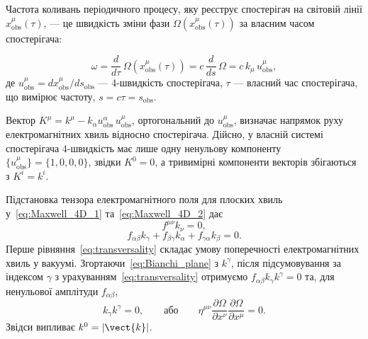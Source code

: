 Частота коливань періодичного процесу, яку реєструє спостерігач на світовій лінії $x_\text{obs}^{\mu}(\tau)$, --- це
швидкість зміни фази $\Omega\!\left(x_{\text{obs}}^{\mu}(\tau)\right)$ за власним часом спостерігача:

\begin{equation}\label{eq:freq_observer}
    \omega = \frac{d}{d\tau}\,\Omega\!\left(x_{\text{obs}}^{\mu}(\tau)\right)
    = c\,\frac{d}{ds}\,\Omega = c\,k_{\mu}\,u_{\text{obs}}^{\mu},
\end{equation}
де $u_{\text{obs}}^{\mu}=dx_{\text{obs}}^{\mu}/ds_{\text{obs}}$ --- 4-швидкість спостерігача, $\tau$ --- власний час
спостерігача, що вимірює частоту, $s=c\tau=s_{\text{obs}}$.

Вектор $K^{\mu}=k^{\mu}-k_{\alpha}u_{\text{obs}}^{\alpha}\,u_{\text{obs}}^{\mu}$, ортогональний до
$u_{\text{obs}}^{\mu}$, визначає напрямок руху електромагнітних хвиль відносно спостерігача. Дійсно, у власній системі
спостерігача 4-швидкість має лише одну ненульову компоненту $\{u_{\text{obs}}^{\mu}\}=\{1,0,0,0\}$, звідки $K^0=0$, а
тривимірні компоненти векторів збігаються з $K^i=k^i$.

Підстановка тензора електромагнітного поля для плоских хвиль у~\eqref{eq:Maxwell_4D_1} та~\eqref{eq:Maxwell_4D_2} дає
\begin{equation}\label{eq:transversality}
    f^{\mu\nu}k_{\nu} = 0,
\end{equation}
\begin{equation}\label{eq:Bianchi_plane}
    f_{\alpha\beta}k_{\gamma} + f_{\beta\gamma}k_{\alpha} + f_{\gamma\alpha}k_{\beta} = 0.
\end{equation}
Перше рівняння~\eqref{eq:transversality} складає умову поперечності електромагнітних хвиль у вакуумі.
Згортаючи~\eqref{eq:Bianchi_plane} з $k^{\gamma}$, після підсумовування за індексом $\gamma$ з
урахуванням~\eqref{eq:transversality} отримуємо $f_{\alpha\beta}k_{\gamma}k^{\gamma}=0$ та, для ненульової амплітуди
$f_{\alpha\beta}$,
\begin{equation}\label{eq:lightlike}
    k_{\gamma}k^{\gamma} = 0,
    \qquad\text{або}\qquad
    \eta^{\mu\nu}\frac{\partial\Omega}{\partial x^{\nu}}\frac{\partial\Omega}{\partial x^{\mu}} = 0.
\end{equation}
Звідси випливає $k^0=|\vect{k}|$.

